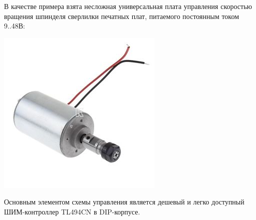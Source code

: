 В качестве примера взята несложная универсальная плата управления
скоростью вращения шпинделя сверлилки печатных плат,
питаемого постоянным током 9..48В:

\includegraphics[height=0.5\textheight]{SpindleDriver/spindle.jpeg}

Основным элементом схемы управления является дешевый и легко
доступный ШИМ-контроллер TL494CN в DIP-корпусе.

